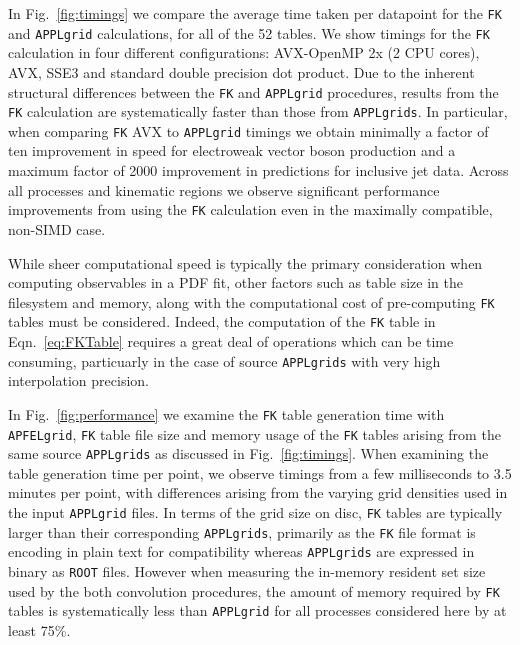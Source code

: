 \documentclass[preprint,12pt]{elsarticle}
\begin{document}
In Fig.~\ref{fig:timings} we compare the average time taken per datapoint
for the {\tt FK} and {\tt APPLgrid} calculations, for all of the 52
tables. We show timings for the {\tt FK} calculation in four
different configurations: AVX-OpenMP 2x (2 CPU cores), AVX, SSE3 and
standard double precision dot product. Due to the inherent structural differences between the {\tt FK} and {\tt APPLgrid} procedures,
results from the {\tt FK} calculation are systematically faster than those from {\tt APPLgrids}.
In particular, when comparing {\tt FK} AVX to {\tt APPLgrid} timings we obtain minimally a factor
of ten improvement in speed for electroweak vector boson production and
a maximum factor of 2000 improvement in predictions for inclusive jet data. Across all processes
and kinematic regions we observe significant performance improvements from using the {\tt FK} calculation
even in the maximally compatible, non-SIMD case.

While sheer computational speed is typically the primary consideration when computing observables
in a PDF fit, other factors such as table size in the filesystem and memory, along with the computational cost of
pre-computing {\tt FK} tables must be considered. Indeed, the computation of the {\tt FK} table in Eqn.~\ref{eq:FKTable}
requires a great deal of operations which can be time consuming, particuarly in the case of source {\tt APPLgrids} with very high
interpolation precision.

In Fig.~\ref{fig:performance} we examine the {\tt FK} table generation time with {\tt APFELgrid}, {\tt FK} table file size and memory usage of the {\tt FK} tables arising from the same source {\tt APPLgrids} as discussed in Fig.~\ref{fig:timings}. 
When examining the table generation time per point, we observe timings from a few milliseconds to
3.5 minutes per point, with differences arising from the varying grid densities used in the input {\tt APPLgrid} files. 
In terms of the grid size on disc, {\tt FK} tables are typically larger than their corresponding {\tt APPLgrids}, primarily as the {\tt FK} file format is encoding in plain text for compatibility whereas {\tt APPLgrids} are expressed in binary as {\tt ROOT} files. However when
measuring the in-memory resident set size used by the both convolution procedures, the amount of memory required by {\tt FK} tables is systematically less than {\tt APPLgrid} for all processes considered here by at least 75\%.

\end{document}
